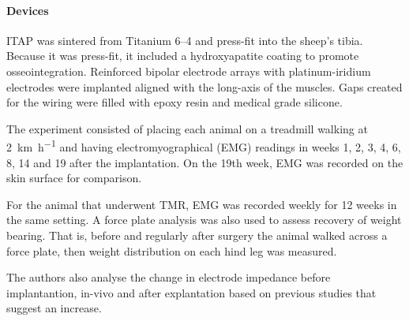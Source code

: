 \paragraph{Devices}
ITAP was sintered from Titanium 6--4 and press-fit into the sheep's tibia. Because it was press-fit, it included a hydroxyapatite coating to promote osseointegration.
Reinforced bipolar electrode arrays with platinum-iridium electrodes were implanted aligned with the long-axis of the muscles.
Gaps created for the wiring were filled with epoxy resin and medical grade silicone.

The experiment consisted of placing each animal on a treadmill walking at \SI{2}{\kilo\metre\per\hour} and having electromyographical (EMG) readings in weeks 1, 2, 3, 4, 6, 8, 14 and 19 after the implantation.
On the 19th week, EMG was recorded on the skin surface for comparison.

For the animal that underwent TMR, EMG was recorded weekly for 12 weeks in the same setting.
A force plate analysis was also used to assess recovery of weight bearing.
That is, before and regularly after surgery the animal walked across a force plate, then weight distribution on each hind leg was measured.

The authors also analyse the change in electrode impedance before implantantion, in-vivo and after explantation based on previous studies that suggest an increase.